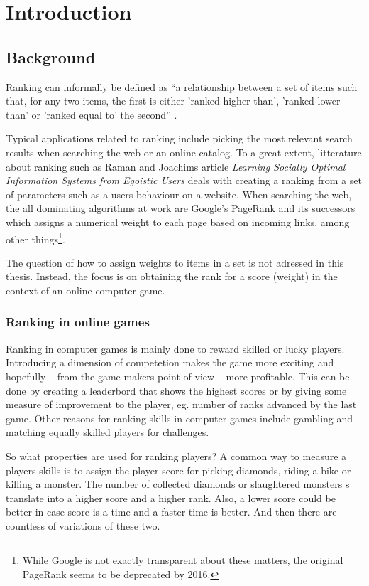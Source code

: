 \chapter{Introduction}

\section{Background}

Ranking can informally be defined as ``a relationship between a set of items such that, for any two items, the first is either 'ranked higher than', 'ranked lower than' or 'ranked equal to' the second'' \cite{wiki:ranking}.

Typical applications related to ranking include picking the most relevant search results when searching the web or an online catalog. To a great extent, litterature about ranking such as Raman and Joachims article \emph{Learning Socially Optimal Information Systems from Egoistic Users} \cite{raman} deals with creating a ranking from a set of parameters such as a users behaviour on a website. When searching the web, the all dominating algorithms at work are Google's PageRank and its successors which assigns a numerical weight to each page based on incoming links, among other things\footnote{While Google is not exactly transparent about these matters, the original PageRank seems to be deprecated by 2016.}.

The question of how to assign weights to items in a set is not adressed in this thesis. Instead, the focus is on obtaining the rank for a score (weight) in the context of an online computer game.   

\subsection*{Ranking in online games}

Ranking in computer games is mainly done to reward skilled or lucky players. Introducing a dimension of competetion makes the game more exciting and hopefully -- from the game makers point of view -- more profitable. This can be done by creating a leaderbord that shows the highest scores or by giving some measure of improvement to the player, eg. number of ranks advanced by the last game. Other reasons for ranking skills in computer games include gambling and matching equally skilled players for challenges.

So what properties are used for ranking players? A common way to measure a players skills is to assign the player score for picking diamonds, riding a bike or killing a monster. The number of collected diamonds or slaughtered monsters s translate into a higher score and a higher rank. Also, a lower score could be better in case score is a time and a faster time is better. And then there are countless of variations of these two.

